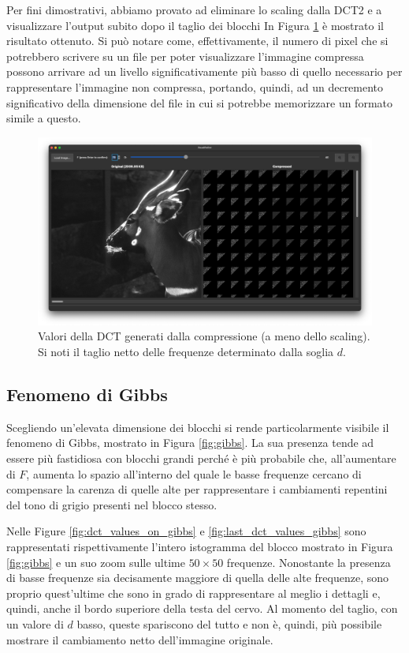 Per fini dimostrativi, abbiamo provato ad eliminare lo scaling dalla DCT2 e a visualizzare l'output subito dopo il taglio dei blocchi In Figura \ref{fig:compression_values} è mostrato il risultato ottenuto. Si può notare come, effettivamente, il numero di pixel che si potrebbero scrivere su un file per poter visualizzare l'immagine compressa possono arrivare ad un livello significativamente più basso di quello necessario per rappresentare l'immagine non compressa, portando, quindi, ad un decremento significativo della dimensione del file in cui si potrebbe memorizzare un formato simile a questo.

\begin{figure}[h]
	\centering
	\includegraphics[width=1\linewidth]{figures/qt_dct_values}
	\caption{Valori della DCT generati dalla compressione (a meno dello scaling). Si noti il taglio netto delle frequenze determinato dalla soglia $d$.}
	\label{fig:compression_values}
\end{figure}

\subsection{Fenomeno di Gibbs}

Scegliendo un'elevata dimensione dei blocchi si rende particolarmente visibile il fenomeno di Gibbs, mostrato in Figura \ref{fig:gibbs}. La sua presenza tende ad essere più fastidiosa con blocchi grandi perché è più probabile che, all'aumentare di $F$, aumenta lo spazio all'interno del quale le basse frequenze cercano di compensare la carenza di quelle alte per rappresentare i cambiamenti repentini del tono di grigio presenti nel blocco stesso.

Nelle Figure \ref{fig:dct_values_on_gibbs} e \ref{fig:last_dct_values_gibbs} sono rappresentati rispettivamente l'intero istogramma del blocco mostrato in Figura \ref{fig:gibbs} e un suo zoom sulle ultime $50 \times 50$ frequenze. Nonostante la presenza di basse frequenze sia decisamente maggiore di quella delle alte frequenze, sono proprio quest'ultime che sono in grado di rappresentare al meglio i dettagli e, quindi, anche il bordo superiore della testa del cervo. Al momento del taglio, con un valore di $d$ basso, queste spariscono del tutto e non è, quindi, più possibile mostrare il cambiamento netto dell'immagine originale.


